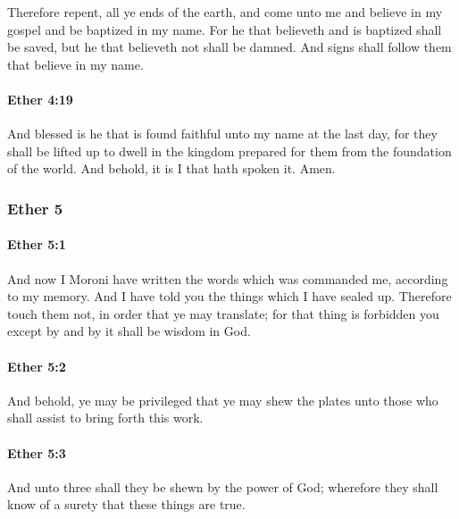 			Therefore repent, all ye ends of the earth,
			and come unto me and believe in my gospel
			and be baptized in my name.
			For he that believeth and is baptized shall be saved,
			but he that believeth not shall be damned.
			And signs shall follow them that believe in my name.

		\paragraph{Ether 4:19} %
			\label{ETHER-4-19}

			And blessed is he that is found faithful unto my name at the last day,
			for they shall be lifted up to dwell in the kingdom
			prepared for them from the foundation of the world.
			And behold, it is I that hath spoken it.
			Amen.

	\subsubsection{Ether 5} %
		\label{ETHER-5}
		
		\paragraph{Ether 5:1} %
			\label{ETHER-5-1}

			And now I Moroni have written the words
			which was commanded me,
			according to my memory.
			And I have told you the things which I have sealed up.
			Therefore touch them not, in order that ye may translate;
			for that thing is forbidden you except by and by it shall be wisdom in God.

		\paragraph{Ether 5:2} %
			\label{ETHER-5-2}

			And behold, ye may be privileged
			that ye may shew the plates unto those
			who shall assist to bring forth this work.

		\paragraph{Ether 5:3} %
			\label{ETHER-5-3}

			And unto three shall they be shewn by the power of God;
			wherefore they shall know of a surety that these things are true.

